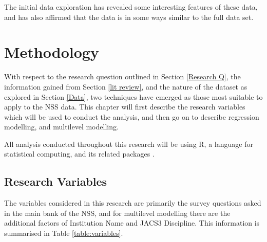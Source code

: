 \documentclass[11pt,a4paper]{report}
\begin{document}
The initial data exploration has revealed some interesting features of these data, and has also affirmed that the data is in some ways similar to the full data set. 

\newpage
\chapter{Methodology}
With respect to the research question outlined in Section \ref{Research Q}, the information gained from Section \ref{lit review}, and the nature of the dataset as explored in Section \ref{Data}, two techniques have emerged as those most suitable to apply to the NSS data. This chapter will first describe the research variables which will be used to conduct the analysis, and then go on to describe regression modelling, and multilevel modelling. 

All analysis conducted throughout this research will be using R, a language for statistical computing, and its related packages \cite{R_language,R_car,R_lme4,R_xtable,R_caret,R_ggplot2,lmerconvenience}.

\section{Research Variables}
The variables considered in this research are primarily the survey questions asked in the main bank of the \ac{NSS}, and for multilevel modelling there are the additional factors of Institution Name and JACS3 Discipline. This information is summarised in Table \ref{table:variables}. 
\end{document}

